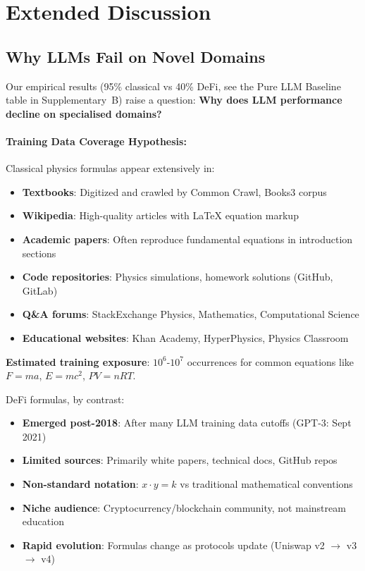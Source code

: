 \documentclass[twoside,11pt]{article}
\begin{document}
\section{Extended Discussion}
\label{app:extended_discussion}

\subsection{Why LLMs Fail on Novel Domains}

Our empirical results (95\% classical vs 40\% DeFi, see the Pure LLM Baseline table in Supplementary~B) raise a question: \textbf{Why does LLM performance decline on specialised domains?}\citep{kambhampati2024llms}

\paragraph{Training Data Coverage Hypothesis:}

Classical physics formulas appear extensively in:
\begin{itemize}
\item \textbf{Textbooks}: Digitized and crawled by Common Crawl, Books3 corpus
\item \textbf{Wikipedia}: High-quality articles with LaTeX equation markup
\item \textbf{Academic papers}: Often reproduce fundamental equations in introduction sections
\item \textbf{Code repositories}: Physics simulations, homework solutions (GitHub, GitLab)
\item \textbf{Q\&A forums}: StackExchange Physics, Mathematics, Computational Science
\item \textbf{Educational websites}: Khan Academy, HyperPhysics, Physics Classroom
\end{itemize}

\textbf{Estimated training exposure}: $10^6$-$10^7$ occurrences for common equations like $F = ma$, $E = mc^2$, $PV = nRT$.

DeFi formulas, by contrast:
\begin{itemize}
\item \textbf{Emerged post-2018}: After many LLM training data cutoffs (GPT-3: Sept 2021)\citep{kambhampati2024llms}
\item \textbf{Limited sources}: Primarily white papers, technical docs, GitHub repos
\item \textbf{Non-standard notation}: $x \cdot y = k$ vs traditional mathematical conventions
\item \textbf{Niche audience}: Cryptocurrency/blockchain community, not mainstream education
\item \textbf{Rapid evolution}: Formulas change as protocols update (Uniswap v2 $\to$ v3 $\to$ v4)
\end{itemize}
\end{document}
